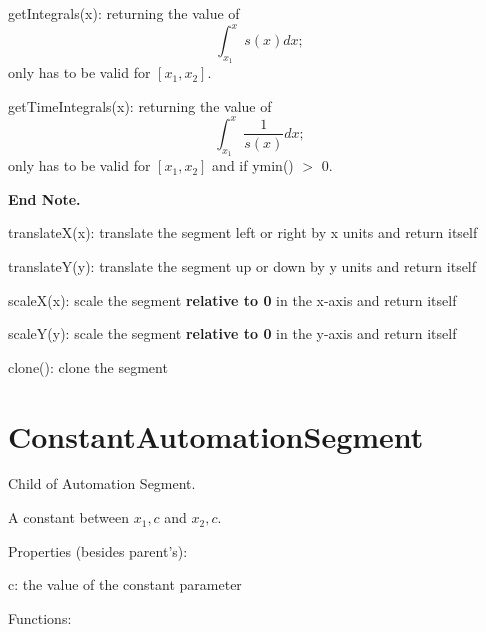 \documentclass{article}
\begin{document}
getIntegrals(x): returning the value of $$\int_{x_1}^x s(x) dx;$$ only has to be valid for $[x_1, x_2]$.

getTimeIntegrals(x): returning the value of $$\int_{x_1}^x \frac{1}{s(x)} dx;$$ only has to be valid for $[x_1, x_2]$ and if ymin() $>$ 0.

\textbf{End Note.}

translateX(x): translate the segment left or right by x units and return itself

translateY(y): translate the segment up or down by y units and return itself

scaleX(x): scale the segment \textbf{relative to 0} in the x-axis and return itself

scaleY(y): scale the segment \textbf{relative to 0} in the y-axis and return itself

clone(): clone the segment



\section{ConstantAutomationSegment}

Child of Automation Segment.

A constant between $x_1, c$ and $x_2, c$.

Properties (besides parent's):

c: the value of the constant parameter

Functions:
\end{document}
